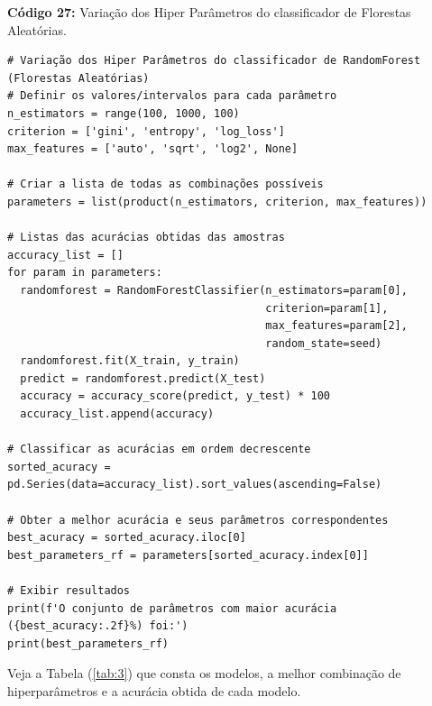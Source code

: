 \documentclass[a4paper,12pt]{article} %
\begin{document}
\begin{center}
\textbf{Código 27:} Variação dos Hiper Parâmetros do classificador de Florestas Aleatórias.
\begin{verbatim}
# Variação dos Hiper Parâmetros do classificador de RandomForest (Florestas Aleatórias)
# Definir os valores/intervalos para cada parâmetro
n_estimators = range(100, 1000, 100)
criterion = ['gini', 'entropy', 'log_loss']
max_features = ['auto', 'sqrt', 'log2', None]

# Criar a lista de todas as combinações possíveis
parameters = list(product(n_estimators, criterion, max_features))

# Listas das acurácias obtidas das amostras
accuracy_list = []
for param in parameters:
  randomforest = RandomForestClassifier(n_estimators=param[0],
                                        criterion=param[1],
                                        max_features=param[2],
                                        random_state=seed)
  randomforest.fit(X_train, y_train)
  predict = randomforest.predict(X_test)
  accuracy = accuracy_score(predict, y_test) * 100
  accuracy_list.append(accuracy)

# Classificar as acurácias em ordem decrescente
sorted_acuracy = pd.Series(data=accuracy_list).sort_values(ascending=False)

# Obter a melhor acurácia e seus parâmetros correspondentes
best_acuracy = sorted_acuracy.iloc[0]
best_parameters_rf = parameters[sorted_acuracy.index[0]]

# Exibir resultados
print(f'O conjunto de parâmetros com maior acurácia ({best_acuracy:.2f}%) foi:')
print(best_parameters_rf)
\end{verbatim}
\end{center}

Veja a Tabela (\ref{tab:3}) que consta os modelos, a melhor combinação de hiperparâmetros e a acurácia obtida de cada modelo.
\end{document}
